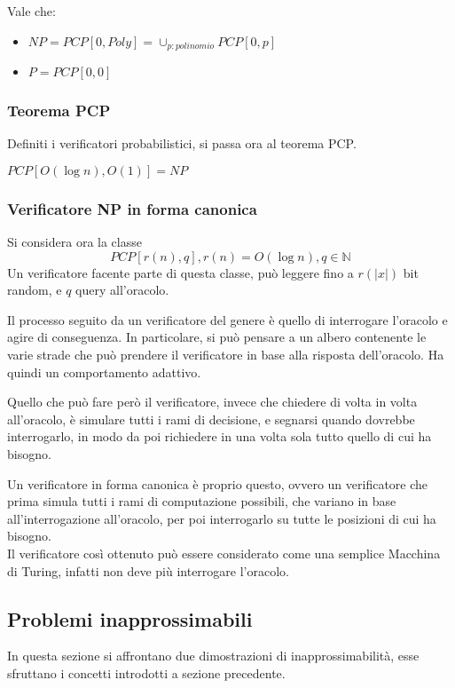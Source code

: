 \begin{remark}
    Vale che:
    \begin{itemize}
        \item $NP = PCP[0,\mathit{Poly}] = \cup_{p : \mathit{polinomio}}PCP[0, p]$ 
        \item $P = PCP[0,0]$
    \end{itemize}
\end{remark}

\subsubsection{Teorema PCP}
Definiti i verificatori probabilistici, si passa ora al teorema PCP.

\begin{theorem}
    $PCP[O(\log n), O(1)] = NP$
\end{theorem}

\subsubsection{Verificatore NP in forma canonica}
Si considera ora la classe 
$$PCP[r(n), q], r(n) = O(\log n), q \in \mathbb{N}$$
Un verificatore facente parte di questa classe, può leggere 
fino a $r(|x|)$ bit random, e $q$ query all'oracolo.

Il processo seguito da un verificatore del genere è quello 
di interrogare l'oracolo e agire di conseguenza.
In particolare, si può pensare a un albero contenente le varie strade che può prendere 
il verificatore in base alla risposta dell'oracolo. Ha quindi un comportamento 
adattivo.

Quello che può fare però il verificatore, invece che chiedere di volta in volta 
all'oracolo, è simulare tutti i rami di decisione, e segnarsi quando dovrebbe 
interrogarlo, in modo da poi richiedere in una volta sola tutto quello di 
cui ha bisogno.

Un verificatore in forma canonica è proprio questo, ovvero un verificatore che prima
simula tutti i rami di computazione possibili, che variano in base all'interrogazione
all'oracolo, per poi interrogarlo su tutte le posizioni di cui ha bisogno.\\
Il verificatore così ottenuto può essere considerato come una semplice Macchina di Turing, 
infatti non deve più interrogare l'oracolo.

\subsection{Problemi inapprossimabili}
In questa sezione si affrontano due dimostrazioni di inapprossimabilità, 
esse sfruttano i concetti introdotti a sezione precedente.

